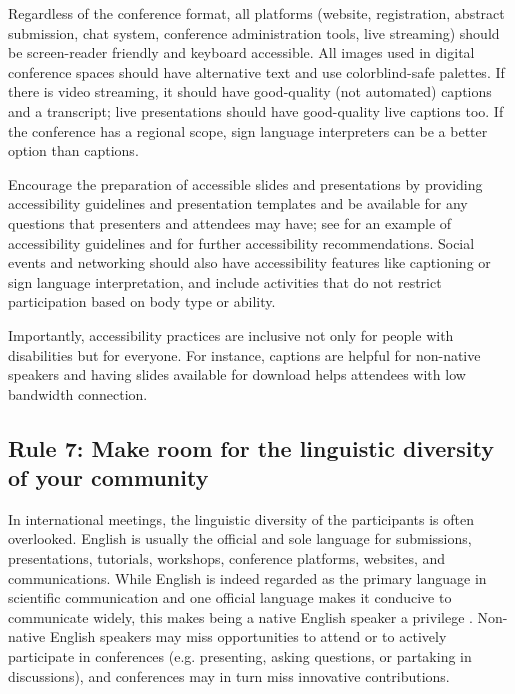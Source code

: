 \documentclass[10pt,letterpaper]{article}
\begin{document}
Regardless of the conference format, all platforms (website, registration, abstract submission, chat system, conference administration tools, live streaming) should be screen-reader friendly and keyboard accessible.
All images used in digital conference spaces should have alternative text and use colorblind-safe palettes.
If there is video streaming, it should have good-quality (not automated) captions and a transcript; live presentations should have good-quality live captions too.
If the conference has a regional scope, sign language interpreters can be a better option than captions.

Encourage the preparation of accessible slides and presentations by providing accessibility guidelines and presentation templates and be available for any questions that presenters and attendees may have; see \cite{sanchez-tapia_user_2021} for an example of accessibility guidelines and \cite{chavez_preparing_2021, sanchez-tapia_making_2021, joo_how_2021} for further accessibility recommendations.
Social events and networking should also have accessibility features like captioning or sign language interpretation, and include activities that do not restrict participation based on body type or ability.

Importantly, accessibility practices are inclusive not only for people with disabilities but for everyone.
For instance, captions are helpful for non-native speakers and having slides available for download helps attendees with low bandwidth connection. 


\subsection*{Rule 7: Make room for the linguistic diversity of your community}
\label{rule_language}

In international meetings, the linguistic diversity of the participants is often overlooked. 
English is usually the official and sole language for submissions, presentations, tutorials, workshops, conference platforms, websites, and communications. 
While English is indeed regarded as the primary language in scientific communication and one official language makes it conducive to communicate widely, this makes being a native English speaker a privilege \cite{amanoTenTipsOvercoming2021}. 
Non-native English speakers may miss opportunities to attend or to actively participate in conferences (e.g. presenting, asking questions, or partaking in discussions),
and conferences may in turn miss innovative contributions.
\end{document}
